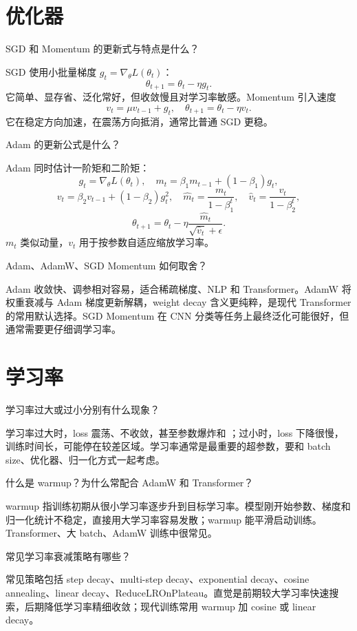 \section{优化器}
\begin{interview}
SGD 和 Momentum 的更新式与特点是什么？
\end{interview}
\begin{answer}
SGD 使用小批量梯度 $g_t=\nabla_\theta L(\theta_t)$：
\[
\theta_{t+1}=\theta_t-\eta g_t.
\]
它简单、显存省、泛化常好，但收敛慢且对学习率敏感。Momentum 引入速度
\[
v_t=\mu v_{t-1}+g_t,
\quad
\theta_{t+1}=\theta_t-\eta v_t.
\]
它在稳定方向加速，在震荡方向抵消，通常比普通 SGD 更稳。
\end{answer}
\begin{interview}
Adam 的更新公式是什么？
\end{interview}
\begin{answer}
Adam 同时估计一阶矩和二阶矩：
\[
g_t=\nabla_\theta L(\theta_t),
\quad
m_t=\beta_1m_{t-1}+(1-\beta_1)g_t,
\]
\[
v_t=\beta_2v_{t-1}+(1-\beta_2)g_t^2,
\quad
\hat{m}_t=\frac{m_t}{1-\beta_1^t},
\quad
\hat{v}_t=\frac{v_t}{1-\beta_2^t},
\]
\[
\theta_{t+1}=\theta_t-\eta\frac{\hat{m}_t}{\sqrt{\hat{v}_t}+\epsilon}.
\]
$m_t$ 类似动量，$v_t$ 用于按参数自适应缩放学习率。
\end{answer}
\begin{interview}
Adam、AdamW、SGD Momentum 如何取舍？
\end{interview}
\begin{answer}
Adam 收敛快、调参相对容易，适合稀疏梯度、NLP 和 Transformer。AdamW 将权重衰减与 Adam 梯度更新解耦，weight decay 含义更纯粹，是现代 Transformer 的常用默认选择。SGD Momentum 在 CNN 分类等任务上最终泛化可能很好，但通常需要更仔细调学习率。
\end{answer}
\section{学习率}
\begin{interview}
学习率过大或过小分别有什么现象？
\end{interview}
\begin{answer}
学习率过大时，loss 震荡、不收敛，甚至参数爆炸和 ；过小时，loss 下降很慢，训练时间长，可能停在较差区域。学习率通常是最重要的超参数，要和 batch size、优化器、归一化方式一起考虑。
\end{answer}
\begin{interview}
什么是 warmup？为什么常配合 AdamW 和 Transformer？
\end{interview}
\begin{answer}
warmup 指训练初期从很小学习率逐步升到目标学习率。模型刚开始参数、梯度和归一化统计不稳定，直接用大学习率容易发散；warmup 能平滑启动训练。Transformer、大 batch、AdamW 训练中很常见。
\end{answer}
\begin{interview}
常见学习率衰减策略有哪些？
\end{interview}
\begin{answer}
常见策略包括 step decay、multi-step decay、exponential decay、cosine annealing、linear decay、ReduceLROnPlateau。直觉是前期较大学习率快速搜索，后期降低学习率精细收敛；现代训练常用 warmup 加 cosine 或 linear decay。
\end{answer}
